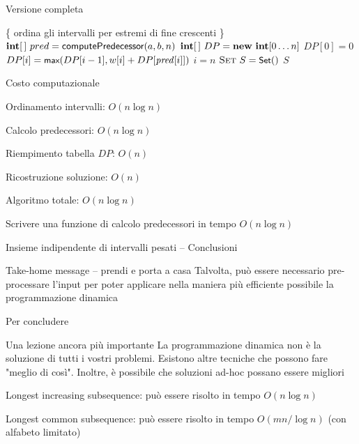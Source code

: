 \begin{frame}[shrink=10]{Versione completa}

\vspace{-12pt}
\begin{Procedure}
\caption[A]{\Set\ \maxinterval($\INTARRAY\ a,\ \INTARRAY\ b,\ \INTARRAY w$, \INTEGER $n$)}	

\{ ordina gli intervalli per estremi di fine crescenti \}\;
$\INTARRAY\ pred = \textsf{computePredecessor}(a,b,n)$\;
$\INTARRAY\ DP = \NEW\ \INTEGER[0 \mldots n]$\;
$DP[0] = 0$\;
{
  $DP[i] = \textsf{{\small max}}(DP[i-1], w[i] + DP[\mathit{pred}[i]])$\;
}
$i = n$\;
$\textsc{Set}\ S = \textsf{{\small Set}}()$\;
{
}
\Return $S$\;
\end{Procedure}

\end{frame}

\begin{frame}{Costo computazionale}

\BIL
\item Ordinamento intervalli: \alert{$O(n \log n)$}
\item Calcolo predecessori: \alert{$O(n \log n)$}
\item Riempimento tabella $DP$: \alert{$O(n)$}
\item Ricostruzione soluzione: \alert{$O(n)$}
\item Algoritmo totale: \alert{$O(n \log n)$}
\EIL

\bigskip
{}
Scrivere una funzione di calcolo predecessori in tempo $O(n \log n)$

\end{frame}

\begin{frame}{Insieme indipendente di intervalli pesati -- Conclusioni}

\begin{block}{Take-home message -- prendi e porta a casa}
Talvolta, può essere necessario pre-processare l'input per poter applicare nella maniera più efficiente possibile la programmazione dinamica
\end{block}

\end{frame}

\begin{frame}{Per concludere}

\begin{block}{Una lezione ancora più importante}
La programmazione dinamica non è la soluzione di tutti i vostri problemi. Esistono altre tecniche che possono fare "meglio di così". Inoltre, è possibile che soluzioni ad-hoc possano essere migliori
\end{block}

\bigskip
{}
\BIL
\item \alert{Longest increasing subsequence}: può essere risolto in tempo $O(n \log n)$
\item \alert{Longest common subsequence}: può essere risolto in tempo $O(mn/\log n)$ (con alfabeto limitato)
\EIL

\end{frame}

